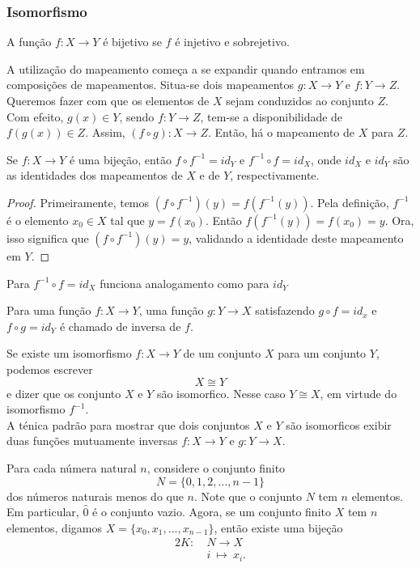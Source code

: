       \subsubsection{Isomorfismo}
         \begin{definition}
            A função $f:X \to Y$ é bijetivo se $f$ é injetivo e sobrejetivo.
         \end{definition}
         A utilização do mapeamento começa a se expandir quando entramos em composições de mapeamentos. Situa-se dois mapeamentos $g:X \to Y$ e $f:Y \to Z$. Queremos fazer com que os elementos de $X$ sejam conduzidos ao conjunto $Z$. Com efeito, $g(x) \in Y$, sendo $f:Y \to Z$, tem-se a disponibilidade de $f(g(x)) \in Z$. Assim, $(f\circ g):X \to Z$. Então, há o mapeamento de $X$ para $Z$.
         \begin{lemma}
            Se $f:X \to Y$ é uma bijeção, então $f\circ f^{-1} = id_{Y}$ e $f^{-1} \circ f=id_{X}$, onde $id_{X}$ e $id_{Y}$ são as identidades dos mapeamentos de $X$ e de $Y$, respectivamente.
            \begin{proof}
               Primeiramente, temos $(f\circ f^{-1})(y)=f(f^{-1}(y))$. Pela definição, $f^{-1}$ é o elemento $x_{0}\in X$ tal que $y=f(x_{0})$. Então $f(f^{-1}(y))=f(x_{0})=y$. Ora, isso significa que $(f\circ f^{-1})(y) = y$, validando a identidade deste mapeamento em $Y$.
            \end{proof}
         \end{lemma}
         Para $f^{-1}\circ f = id_{X}$ funciona analogamento como para $id_{Y}$
         \begin{definition}
            Para uma função $f: X \to Y$, uma função $g: Y \to X$ satisfazendo $g \circ f = id_{x}$ e $f \circ g = id_{Y}$ é chamado de inversa de $f$.
         \end{definition}
         Se existe um isomorfismo $f: X \to Y$ de um conjunto $X$ para um conjunto $Y$, podemos escrever $$X \cong Y$$ e dizer que os conjunto $X$ e $Y$ são isomorfico. Nesse caso $Y \cong X$, em virtude do isomorfismo $f^{-1}$.\\
         A ténica padrão para mostrar que dois conjuntos $X$ e $Y$ são isomorficos exibir duas funções mutuamente inversas $f: X \to Y$ e $g: Y \to X$.
         \begin{exmp}
            Para cada númera natural $n$, considere o conjunto finito $$N = \{0,1,2, ..., n -1\}$$
            dos números naturais menos do que $n$. Note que o conjunto $N$ tem $n$ elementos. Em particular, $\widehat{0}$ é o conjunto vazio. Agora, se um conjunto finito $X$ tem $n$ elementos, digamos $X = \{x_{0},x_{1},...,x_{n-1}\}$, então existe uma bijeção
            \begin{alignat}{2}
               K:\ &N \to X \nonumber\\
               &i\ \mapsto\ x_{i}.
               \nonumber
            \end{alignat}
         \end{exmp}
